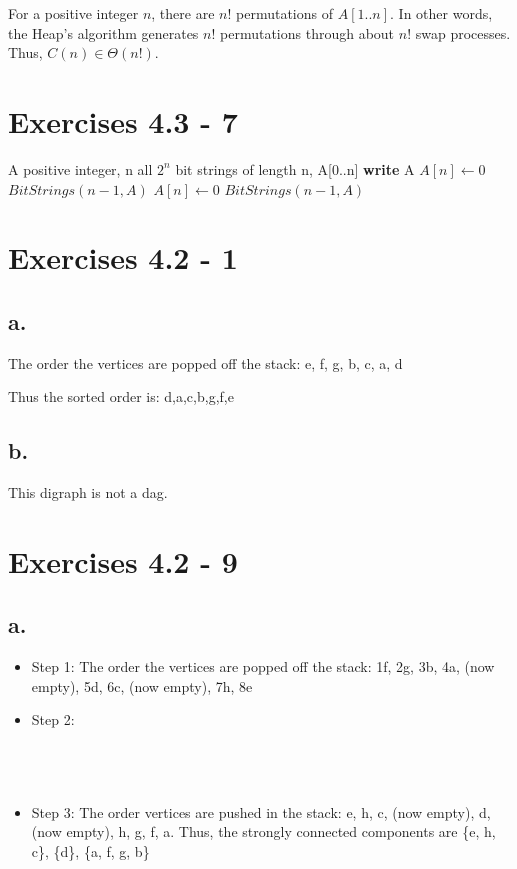 \documentclass{article}
\begin{document}
For a positive integer $n$, there are $n!$ permutations of $A[1..n]$. In other words, the Heap's algorithm generates $n!$ permutations through about $n!$ swap processes. Thus, $C(n) \in \Theta(n!)$.

\section{Exercises 4.3 - 7}

\begin{center}
\begin{algorithmic}
\INPUT
A positive integer, n
\OUTPUT
all $2^n$ bit strings of length n, A[0..n]
\State \textbf{write} A
\EndIf
\State $A[n] \leftarrow 0$
\State $BitStrings(n-1,A)$
\State $A[n] \leftarrow 0$
\State $BitStrings(n-1,A)$
\EndFunction
\end{algorithmic}
\end{center}

\section{Exercises 4.2 - 1}

\subsection*{a.}

The order the vertices are popped off the stack: e, f, g, b, c, a, d

Thus the sorted order is: d,a,c,b,g,f,e

\subsection*{b.}

This digraph is not a dag.

\section{Exercises 4.2 - 9}

\subsection*{a.}

\begin{itemize}
\item Step 1: The order the vertices are popped off the stack: 1f, 2g, 3b, 4a, (now empty), 5d, 6c, (now empty), 7h, 8e
\item Step 2:\\ \\ \\ \\
\item Step 3: The order vertices are pushed in the stack: e, h, c, (now empty), d, (now empty), h, g, f, a. Thus, the strongly connected components are \{e, h, c\}, \{d\}, \{a, f, g, b\}
\end{itemize}
\end{document}
